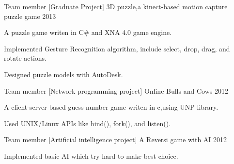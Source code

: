 
\begin{cventries}

  \cventry
    {Team member} %
    {[Graduate Project] 3D puzzle,a kinect-based motion capture puzzle game} %
    {} %
    {2013} %
    {
      \begin{cvitems} %
      \item {A puzzle game writen in C\# and XNA 4.0 game engine.}
      \item {Implemented Gesture Recognition algorithm, include select, drop, drag, and rotate actions.}
      \item {Designed puzzle models with AutoDesk.}
      \end{cvitems}
    }

  \cventry
    {Team member} %
    {[Network programming project] Online Bulls and Cows }
    {} %
    {2012} %
    {
      \begin{cvitems} %
      \item {A client-server based guess number game writen in c,using UNP library.}
      \item {Used UNIX/Linux APIs like bind(), fork(), and listen().}
      \end{cvitems}
    }

  \cventry
    {Team member} %
    {[Artificial intelligence project] A Reversi game with AI}
    {} %
    {2012} %
    {
      \begin{cvitems} %
      \item {Implemented basic AI which try hard to make best choice.}
      \end{cvitems}
    }

\end{cventries}

